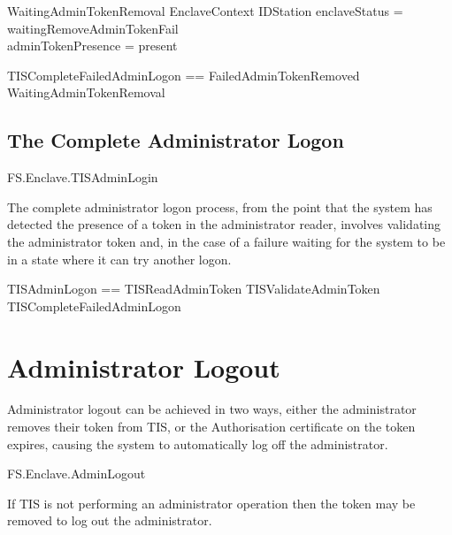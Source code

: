 \begin{schema}{WaitingAdminTokenRemoval}
        EnclaveContext
\also
        \Xi IDStation
\where
        enclaveStatus = waitingRemoveAdminTokenFail
\\      adminTokenPresence = present     
\end{schema}

\begin{zed}
        TISCompleteFailedAdminLogon == FailedAdminTokenRemoved 
\lor WaitingAdminTokenRemoval
\end{zed}

\subsection{The Complete Administrator Logon}

\begin{traceunit}{FS.Enclave.TISAdminLogin}
\end{traceunit}

The complete administrator logon process, from the point that the
system has detected the presence of a token in the administrator
reader, involves 
validating the administrator token and, in the case of a failure 
waiting for the system to be in a state where it can try another logon.

\begin{zed}
        TISAdminLogon == TISReadAdminToken \lor TISValidateAdminToken \lor TISCompleteFailedAdminLogon
\end{zed}

\section{Administrator Logout}

Administrator logout can be achieved in two ways, either the
administrator removes their token from TIS, or the Authorisation
certificate on the token expires, causing the system to automatically
log off the administrator.

\begin{traceunit}{FS.Enclave.AdminLogout}
\end{traceunit}

If TIS is not performing an administrator operation then the
token may be removed to log out the administrator.

